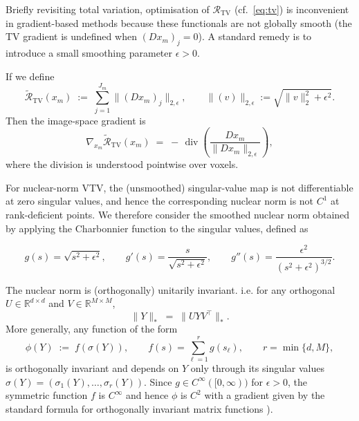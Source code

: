 Briefly revisiting total variation, optimisation of $\mathcal{R}_{\mathrm{TV}}$ (cf.\ \eqref{eq:tv}) is inconvenient in gradient-based methods because these functionals are not globally smooth (the TV gradient is undefined when $(D x_m)_j=0$). A standard remedy is to introduce a small smoothing parameter $\epsilon>0$.

If we define
\begin{equation}
\tilde{\mathcal{R}}_{\mathrm{TV}}(x_m)
\;:=\;
\sum_{j=1}^{J_m} \|(D x_m)_j\|_{2,\epsilon},
\qquad
\|(v)\|_{2,\epsilon}:=\sqrt{\|v\|_2^2+\epsilon^2}.
\end{equation}
Then the image-space gradient is
\begin{equation}
\nabla_{x_m}\tilde{\mathcal{R}}_{\mathrm{TV}}(x_m)
\;=\;
-\,\operatorname{div}\!\left(\frac{D x_m}{\|D x_m\|_{2,\epsilon}}\right),
\end{equation}
where the division is understood pointwise over voxels.

For nuclear-norm VTV, the (unsmoothed) singular-value map is not differentiable at zero singular values, and hence the corresponding nuclear norm is not $C^1$ at rank-deficient points. We therefore consider the smoothed nuclear norm obtained by applying the Charbonnier function to the singular values, defined as

\begin{equation}\label{eq:charbonnier_g}
g(s)=\sqrt{s^2+\epsilon^2},
\qquad
g'(s) = \frac{s}{\sqrt{s^2+\epsilon^2}},
\qquad
g''(s)=\frac{\epsilon^2}{(s^2+\epsilon^2)^{3/2}}.
\end{equation}

The nuclear norm is (orthogonally) unitarily invariant. i.e. for any orthogonal $U\in\mathbb{R}^{d\times d}$ and $V\in\mathbb{R}^{M\times M}$,
\begin{equation}
\|Y\|_* \;=\; \|U Y V^\top\|_*.
\end{equation}
More generally, any function of the form
\begin{equation}
\phi(Y) \;:=\; f(\sigma(Y)),
\qquad
f(s)=\sum_{\ell=1}^{r} g(s_\ell),
\qquad
r=\min\{d,M\},
\end{equation}
is orthogonally invariant and depends on $Y$ only through its singular values $\sigma(Y)=(\sigma_1(Y),\dots,\sigma_r(Y))$.
Since $g\in C^\infty([0,\infty))$ for $\epsilon>0$, the symmetric function $f$ is $C^\infty$ and hence $\phi$ is $C^2$ with a gradient given by the standard formula for orthogonally invariant matrix functions \cite{lewis_convex_1995,lewis_derivatives_1996}).

